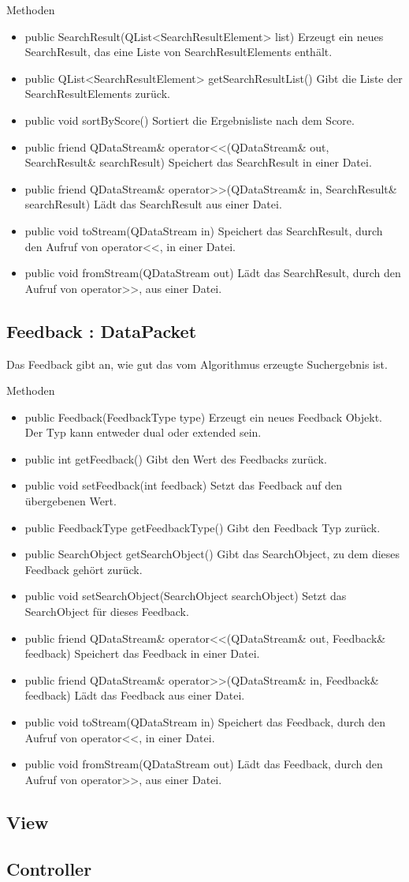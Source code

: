 Methoden
\begin{itemize}
\item public SearchResult(QList<SearchResultElement> list) Erzeugt ein neues SearchResult, das eine Liste von SearchResultElements enthält.
\item public QList<SearchResultElement> getSearchResultList() Gibt die Liste der SearchResultElements zurück.
\item public void sortByScore() Sortiert die Ergebnisliste nach dem Score.
\item public friend QDataStream\& operator<<(QDataStream\& out, SearchResult\& searchResult) Speichert das SearchResult in einer Datei.
\item public friend QDataStream\& operator>>(QDataStream\& in, SearchResult\& searchResult) Lädt das SearchResult aus einer Datei.
\item public void toStream(QDataStream in) Speichert das SearchResult, durch den Aufruf von operator<<, in einer Datei.
\item public void fromStream(QDataStream out) Lädt das SearchResult, durch den Aufruf von operator>>, aus einer Datei.
\end{itemize}

\subsection*{Feedback : DataPacket}
Das Feedback gibt an, wie gut das vom Algorithmus erzeugte Suchergebnis ist.

Methoden
\begin{itemize}
\item public Feedback(FeedbackType type) Erzeugt ein neues Feedback Objekt. Der Typ kann entweder dual oder extended sein.
\item public int getFeedback() Gibt den Wert des Feedbacks zurück.
\item public void setFeedback(int feedback) Setzt das Feedback auf den übergebenen Wert.
\item public FeedbackType getFeedbackType() Gibt den Feedback Typ zurück.
\item public SearchObject getSearchObject() Gibt das SearchObject, zu dem dieses Feedback gehört zurück.
\item public void setSearchObject(SearchObject searchObject) Setzt das SearchObject für dieses Feedback.
\item public friend QDataStream\& operator<<(QDataStream\& out, Feedback\& feedback) Speichert das Feedback in einer Datei.
\item public friend QDataStream\& operator>>(QDataStream\& in, Feedback\& feedback) Lädt das Feedback aus einer Datei.
\item public void toStream(QDataStream in) Speichert das Feedback, durch den Aufruf von operator<<, in einer Datei.
\item public void fromStream(QDataStream out) Lädt das Feedback, durch den Aufruf von operator>>, aus einer Datei.
\end{itemize} 


\subsection{View}

\subsection{Controller}